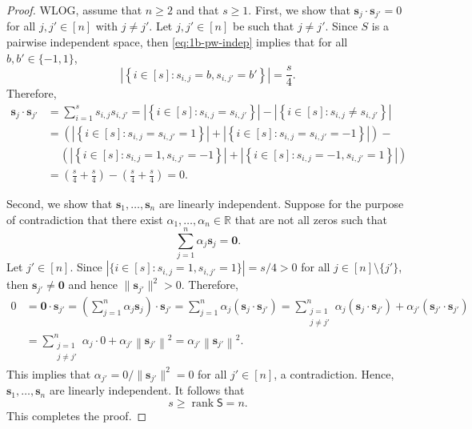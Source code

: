 \documentclass[letterpaper, reqno,11pt]{article}
\newcommand{\RR}{\mathbb{R}}
\DeclareMathOperator{\rank}{rank}
\begin{document}
\begin{enumerate}
\begin{enumerate}
    \begin{proof}
      WLOG, assume that $n \geq 2$ and that $s \geq 1$. First, we show that $\mathbf s_j \cdot \mathbf s_{j'} = 0$ for all $j, j' \in [n]$ with $j \neq j'$. Let $j, j' \in [n]$ be such that $j \neq j'$. Since $S$ is a pairwise independent space, then \eqref{eq:1b-pw-indep} implies that for all $b, b' \in \{ -1, 1 \}$,
      $$ \left|\left\{ i \in [s] : s_{i, j} = b, s_{i, j'} = b' \right\}\right| = \frac{s}{4}. $$
      Therefore,
      \begin{align*}
        \mathbf s_j \cdot \mathbf s_{j'} &= \sum_{i = 1}^s s_{i, j} s_{i, j'} = \left|\left\{ i \in [s] : s_{i, j} = s_{i, j'} \right\}\right| - \left|\left\{ i \in [s] : s_{i, j} \neq s_{i, j'} \right\}\right| \\
        &= \left(\left|\left\{ i \in [s] : s_{i, j} = s_{i, j'} = 1 \right\}\right| + \left|\left\{ i \in [s] : s_{i, j} = s_{i, j'} = -1 \right\}\right|\right) - \\
        &\quad\, \left(\left|\left\{ i \in [s] : s_{i, j} = 1, s_{i, j'} = -1 \right\}\right| + \left|\left\{ i \in [s] : s_{i, j} = -1, s_{i, j'} = 1 \right\}\right|\right) \\
        &= \left(\frac{s}{4} + \frac{s}{4}\right) - \left(\frac{s}{4} + \frac{s}{4}\right) = 0.
      \end{align*}

      Second, we show that $\mathbf s_1, \ldots, \mathbf s_n$ are linearly independent. Suppose for the purpose of contradiction that there exist $\alpha_1, \ldots, \alpha_n \in \RR$ that are not all zeros such that
      $$ \sum_{j = 1}^n \alpha_j \mathbf s_j = \mathbf 0. $$
      Let $j' \in [n]$. Since $|\{ i \in [s] : s_{i, j} = 1, s_{i, j'} = 1 \}| = s/4 > 0$ for all $j \in [n] \setminus \{ j' \}$, then $\mathbf s_{j'} \neq \mathbf 0$ and hence $\|\mathbf s_{j'}\|^2 > 0$. Therefore,
      \begin{align*}
        0 &= \mathbf 0 \cdot \mathbf s_{j'} = \left(\sum_{j = 1}^n \alpha_j \mathbf s_j\right) \cdot \mathbf s_{j'} = \sum_{j = 1}^n \alpha_j \left(\mathbf s_j \cdot \mathbf s_{j'}\right) = \sum_{\substack{j = 1 \\ j \neq j'}}^n \alpha_j \left(\mathbf s_j \cdot \mathbf s_{j'}\right) + \alpha_{j'} \left(\mathbf s_{j'} \cdot \mathbf s_{j'}\right) \\
        &= \sum_{\substack{j = 1 \\ j \neq j'}}^n \alpha_j \cdot 0 + \alpha_{j'} \left\| \mathbf s_{j'} \right\|^2 = \alpha_{j'} \left\| \mathbf s_{j'} \right\|^2.
      \end{align*}
      This implies that $\alpha_{j'} = 0/\| \mathbf s_{j'} \|^2 = 0$ for all $j' \in [n]$, a contradiction. Hence, $\mathbf s_1, \ldots, \mathbf s_n$ are linearly independent. It follows that
      $$ s \geq \rank \mathsf{S} = n. $$
      This completes the proof.
    \end{proof}


\end{enumerate}
\end{enumerate}
\end{document}
